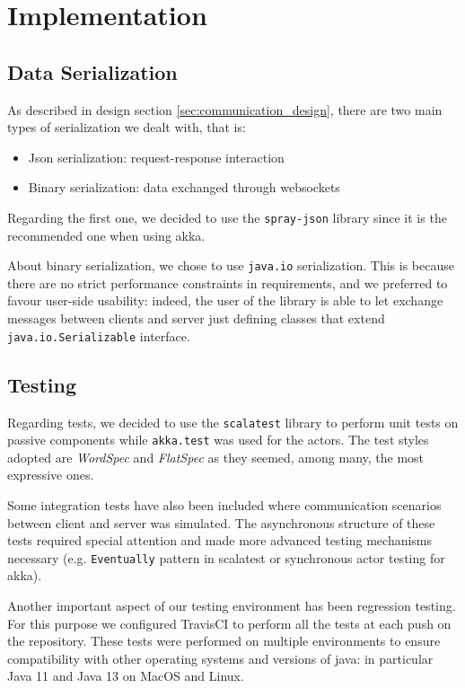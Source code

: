 \chapter{Implementation}
\section{Data Serialization}
As described in design section \ref{sec:communication_design}, there are two main types of serialization we dealt with, that is:
\begin{itemize}
	\item Json serialization: request-response interaction
	\item Binary serialization: data exchanged through websockets
\end{itemize}
Regarding the first one, we decided to use the \texttt{spray-json} library since it is the recommended one when using akka.

About binary serialization, we chose to use \texttt{java.io} serialization. This is because there are no strict performance constraints in requirements, and we preferred to favour user-side usability: indeed, the user of the library is able to let exchange messages between clients and server just defining classes that extend \texttt{java.io.Serializable} interface.

\section{Testing}
Regarding tests, we decided to use the \texttt{scalatest} library to perform unit tests on passive components while \texttt{akka.test} was used for the actors. The test styles adopted are \textit{WordSpec} and \textit{FlatSpec} as they seemed, among many, the most expressive ones. 

Some integration tests have also been included where communication scenarios between client and server was simulated. The asynchronous structure of these tests required special attention and made more advanced testing mechanisms necessary (e.g. \texttt{Eventually} pattern in scalatest or synchronous actor testing for akka).

Another important aspect of our testing environment has been regression testing. For this purpose we configured TravisCI to perform all the tests at each push on the repository. These tests were performed on multiple environments to ensure compatibility with other operating systems and versions of java: in particular Java 11 and Java 13 on MacOS and Linux.

